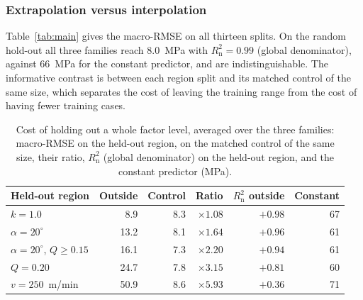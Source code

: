 \documentclass[subscriptcorrection,upint,varvw,barcolor=Goldenrod3,mathalfa=cal=euler,balance,hyphenate,french,pdf-a]{asmejour} %
\begin{document}
\subsubsection{Extrapolation versus interpolation}
\label{sec:res_extrap}


Table~\ref{tab:main} gives the macro-RMSE on all thirteen splits. On the random hold-out all three families reach 8.0~MPa with $R^2_{\mathrm{n}}=0.99$ (global denominator), against 66~MPa for the constant predictor, and are indistinguishable. The informative contrast is between each region split and its matched control of the same size, which separates the cost of leaving the training range from the cost of having fewer training cases.

\begin{table}[t]
\caption{Cost of holding out a whole factor level, averaged over the three families: macro-RMSE on the held-out region, on the matched control of the same size, their ratio, $R^2_{\mathrm{n}}$ (global denominator) on the held-out region, and the constant predictor (MPa).} %
\label{tab:axis}
\centering\small
\begin{tabular}{@{}lrrrrr@{}}
\toprule
Held-out region & Outside & Control & Ratio & $R^2_{\mathrm{n}}$ outside & Constant \\
\midrule
$k=1.0$                              & 8.9  & 8.3 & $\times1.08$ & $+0.98$ & 67 \\
$\alpha=20^\circ$                    & 13.2 & 8.1 & $\times1.64$ & $+0.96$ & 61 \\
$\alpha=20^\circ$, $Q\ge0.15$        & 16.1 & 7.3 & $\times2.20$ & $+0.94$ & 61 \\
$Q=0.20$                             & 24.7 & 7.8 & $\times3.15$ & $+0.81$ & 60 \\
$v=250$~m/min                        & 50.9 & 8.6 & $\times5.93$ & $+0.36$ & 71 \\
\bottomrule
\end{tabular}
\end{table}
\end{document}
